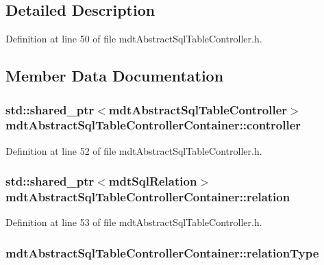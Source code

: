 \subsection{Detailed Description}


Definition at line 50 of file mdt\-Abstract\-Sql\-Table\-Controller.\-h.



\subsection{Member Data Documentation}
\hypertarget{structmdt_abstract_sql_table_controller_container_a78aed5460ebf7f78d18ac80bb855fa39}{
\subsubsection[{controller}]{\setlength{\rightskip}{0pt plus 5cm}std\-::shared\-\_\-ptr$<${\bf mdt\-Abstract\-Sql\-Table\-Controller}$>$ mdt\-Abstract\-Sql\-Table\-Controller\-Container\-::controller}}\label{structmdt_abstract_sql_table_controller_container_a78aed5460ebf7f78d18ac80bb855fa39}


Definition at line 52 of file mdt\-Abstract\-Sql\-Table\-Controller.\-h.

\hypertarget{structmdt_abstract_sql_table_controller_container_ac628635f902685e4c5c15f7cc2327af9}{
\subsubsection[{relation}]{\setlength{\rightskip}{0pt plus 5cm}std\-::shared\-\_\-ptr$<${\bf mdt\-Sql\-Relation}$>$ mdt\-Abstract\-Sql\-Table\-Controller\-Container\-::relation}}\label{structmdt_abstract_sql_table_controller_container_ac628635f902685e4c5c15f7cc2327af9}


Definition at line 53 of file mdt\-Abstract\-Sql\-Table\-Controller.\-h.

\hypertarget{structmdt_abstract_sql_table_controller_container_a95e403f88110d0b5f94b39be887226db}{
\subsubsection[{relation\-Type}]{ mdt\-Abstract\-Sql\-Table\-Controller\-Container\-::relation\-Type}}\label{structmdt_abstract_sql_table_controller_container_a95e403f88110d0b5f94b39be887226db}


